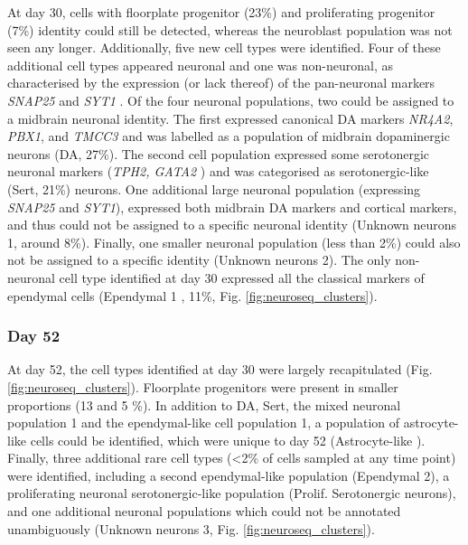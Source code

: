At day 30, cells with floorplate progenitor (23\%) and proliferating progenitor (7\%) identity could still be detected, whereas the neuroblast population was not seen any longer.
Additionally, five new cell types were identified.
Four of these additional cell types appeared neuronal and one was non-neuronal, as characterised by the expression (or lack thereof) of the pan-neuronal markers \textit{SNAP25} and \textit{SYT1} \cite{arenas2015make}.
Of the four neuronal populations, two could be assigned to a midbrain neuronal identity.
The first expressed canonical DA markers \textit{NR4A2}, \textit{PBX1}, and \textit{TMCC3} \cite{la2016molecular, park2006acquisition, ramonet2012park9} and was labelled as a population of midbrain dopaminergic neurons (DA, 27\%).
The second cell population expressed some serotonergic neuronal markers (\textit{TPH2, GATA2} \cite{cummings2019serotonergic}) and was categorised as serotonergic-like (Sert, 21\%) neurons. 
One additional large neuronal population (expressing \textit{SNAP25} and \textit{SYT1}), expressed both midbrain DA markers and cortical markers, and thus could not be assigned to a specific neuronal identity (Unknown neurons 1, around 8\%).
Finally, one smaller neuronal population (less than 2\%) could also not be assigned to a specific identity (Unknown neurons 2). 
The only non-neuronal cell type identified at day 30 expressed all the classical markers of ependymal cells (Ependymal 1 \cite{campbell2017molecular}, 11\%, Fig. \ref{fig:neuroseq_clusters}). 

\subsubsection{Day 52}

At day 52, the cell types identified at day 30 were largely recapitulated (Fig. \ref{fig:neuroseq_clusters}).
Floorplate progenitors were present in smaller proportions (13 and 5 \%).
In addition to DA, Sert, the mixed neuronal population 1 and the ependymal-like cell population 1, a population of astrocyte-like cells could be identified, which were unique to day 52 (Astrocyte-like \cite{sloan2017human, zhang2016purification}). 
Finally, three additional rare cell types (<2\% of cells sampled at any time point) were identified, including a second ependymal-like population (Ependymal 2), a proliferating neuronal serotonergic-like population (Prolif. Serotonergic neurons), and one additional neuronal populations which could not be annotated unambiguously (Unknown neurons 3, Fig. \ref{fig:neuroseq_clusters}). \\

